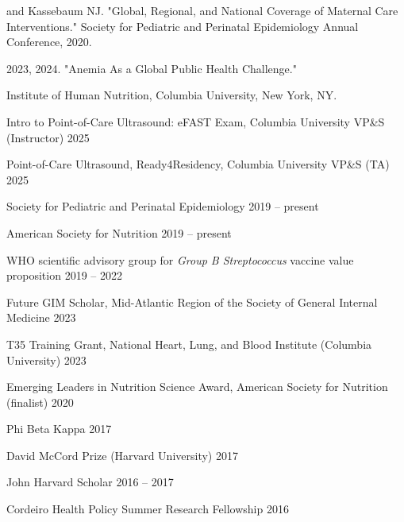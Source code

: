 \documentclass[11pt,article,oneside]{memoir}
\begin{document}
 and Kassebaum NJ. "Global, Regional, and National Coverage of Maternal Care
Interventions." Society for Pediatric and Perinatal Epidemiology Annual Conference, 2020. 

\bigskip 

\medskip

 2023, 2024. "Anemia As a Global Public Health Challenge." 

\indent \indent Institute of Human Nutrition, Columbia University, New York, NY.

\bigskip 

\medskip

\ind Intro to Point-of-Care Ultrasound: eFAST Exam, Columbia University VP\&S (Instructor) \hfill 2025 

\ind Point-of-Care Ultrasound, Ready4Residency, Columbia University VP\&S (TA) \hfill 2025

\bigskip

\medskip

\ind Society for Pediatric and Perinatal Epidemiology \hfill 2019 -- present

\ind American Society for Nutrition \hfill 2019 -- present

\ind WHO scientific advisory group for \emph{Group B Streptococcus} vaccine value proposition \hfill 2019 -- 2022

\bigskip


\medskip

\ind Future GIM Scholar, Mid-Atlantic Region of the Society of General Internal Medicine \hfill 2023

\ind T35 Training Grant, National Heart, Lung, and Blood Institute (Columbia University) \hfill 2023

\ind Emerging Leaders in Nutrition Science Award, American Society for Nutrition (finalist) \hfill 2020

\ind Phi Beta Kappa \hfill 2017

\ind David McCord Prize (Harvard University) \hfill 2017

\ind John Harvard Scholar \hfill 2016 -- 2017

\ind Cordeiro Health Policy Summer Research Fellowship \hfill 2016

\bigskip
\end{document}
